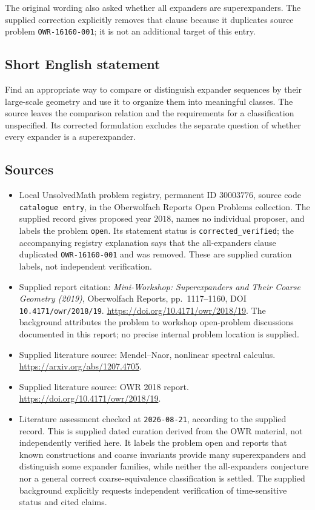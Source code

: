 \documentclass[11pt]{article}
\begin{document}
The original wording also asked whether all expanders are superexpanders. The supplied correction explicitly removes that clause because it duplicates source problem \texttt{OWR-16160-001}; it is not an additional target of this entry.
\subsection{Short English statement}
Find an appropriate way to compare or distinguish expander sequences by their large-scale geometry and use it to organize them into meaningful classes. The source leaves the comparison relation and the requirements for a classification unspecified. Its corrected formulation excludes the separate question of whether every expander is a superexpander.
\subsection{Sources}
\begin{itemize}
\item Local UnsolvedMath problem registry, permanent ID \(30003776\), source code \texttt{catalogue entry}, in the Oberwolfach Reports Open Problems collection. The supplied record gives proposed year \(2018\), names no individual proposer, and labels the problem \texttt{open}. Its statement status is \texttt{corrected\_verified}; the accompanying registry explanation says that the all-expanders clause duplicated \texttt{OWR-16160-001} and was removed. These are supplied curation labels, not independent verification.
\item Supplied report citation: \emph{Mini-Workshop: Superexpanders and Their Coarse Geometry (2019)}, Oberwolfach Reports, pp.\ 1117--1160, DOI \texttt{10.4171/owr/2018/19}. \url{https://doi.org/10.4171/owr/2018/19}. The background attributes the problem to workshop open-problem discussions documented in this report; no precise internal problem location is supplied.
\item Supplied literature source: Mendel--Naor, nonlinear spectral calculus. \url{https://arxiv.org/abs/1207.4705}.
\item Supplied literature source: OWR 2018 report. \url{https://doi.org/10.4171/owr/2018/19}.
\item Literature assessment checked at \texttt{2026-08-21}, according to the supplied record. This is supplied dated curation derived from the OWR material, not independently verified here. It labels the problem open and reports that known constructions and coarse invariants provide many superexpanders and distinguish some expander families, while neither the all-expanders conjecture nor a general correct coarse-equivalence classification is settled. The supplied background explicitly requests independent verification of time-sensitive status and cited claims.
\end{itemize}
\end{document}
